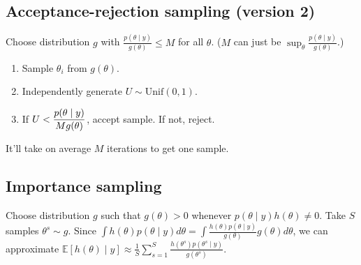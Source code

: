\documentclass[twoside]{article}
\newcommand{\dis}{\displaystyle}
\newcommand\bbE{\mathbb{E}}
\def\t{\theta}
\begin{document}
\subsection*{Acceptance-rejection sampling (version 2)}
Choose distribution $g$ with $\dis\frac{p(\t \mid y)}{g(\t)} \leq M$ for all $\t$. ($M$ can just be $\sup_\t \dis\frac{p(\t \mid y)}{g(\t)}$.)
\begin{enumerate}
\item Sample $\t_i$ from $g(\t)$.
\item Independently generate $U \sim \text{Unif}(0,1)$.
\item If $U < \dis\frac{p(\t \mid y)}{Mg(\t)} \dis$, accept sample. If not, reject.
\end{enumerate}

It'll take on average $M$ iterations to get one sample.

\subsection*{Importance sampling}
Choose distribution $g$ such that $g(\t) > 0$ whenever $p(\t \mid y)h(\t) \neq 0$. Take $S$ samples $\t^s \sim g$. Since $\dis\int h(\t) p(\t \mid y) d\t = \dis\int \frac{h(\t)p(\t \mid y)}{g(\t)} g(\t) d\t$, we can approximate $\bbE [h(\t) \mid y] \approx \dis\frac{1}{S}\sum_{s=1}^S \frac{h(\t^s)p(\t^s \mid y)}{g(\t^s)}$.
\end{document}
